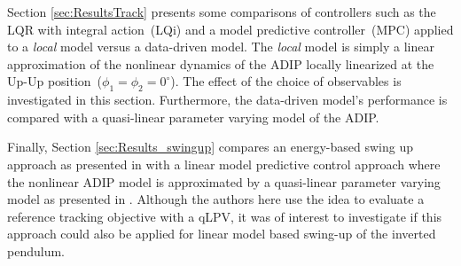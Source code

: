 Section \ref{sec:ResultsTrack} presents some comparisons of controllers such as the LQR with integral action~(LQi) and a model predictive controller~(MPC) applied to a \textit{local} model versus a data-driven model. The \textit{local} model is simply a linear approximation of the nonlinear dynamics of the ADIP locally linearized at the Up-Up position~($\phi_1 = \phi_2 = 0^\circ$). The effect of the choice of observables is investigated in this section. Furthermore, the data-driven model's performance is compared with a quasi-linear parameter varying model of the ADIP. \par
Finally, Section \ref{sec:Results_swingup} compares an energy-based swing up approach as presented in \cite{Fantoni} with a linear model predictive control approach where the nonlinear ADIP model is approximated by a quasi-linear parameter varying model as presented in \cite{qLMPC}. Although the authors here use the idea to evaluate a reference tracking objective with a qLPV, it was of interest to investigate if this approach could also be applied for linear model based swing-up of the inverted pendulum.   
\newpage
% 
%






